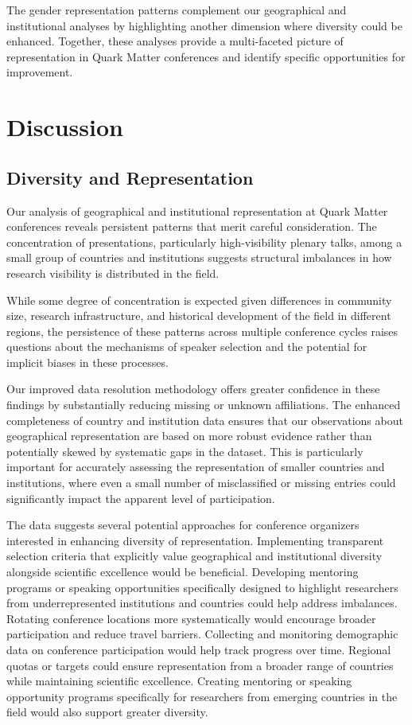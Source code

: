 \documentclass[a4paper,11pt]{article}
\begin{document}
The gender representation patterns complement our geographical and institutional analyses by highlighting another dimension where diversity could be enhanced. Together, these analyses provide a multi-faceted picture of representation in Quark Matter conferences and identify specific opportunities for improvement.

\section{Discussion}

\subsection{Diversity and Representation}

Our analysis of geographical and institutional representation at Quark Matter conferences reveals persistent patterns that merit careful consideration. The concentration of presentations, particularly high-visibility plenary talks, among a small group of countries and institutions suggests structural imbalances in how research visibility is distributed in the field.

While some degree of concentration is expected given differences in community size, research infrastructure, and historical development of the field in different regions, the persistence of these patterns across multiple conference cycles raises questions about the mechanisms of speaker selection and the potential for implicit biases in these processes.

Our improved data resolution methodology offers greater confidence in these findings by substantially reducing missing or unknown affiliations. The enhanced completeness of country and institution data ensures that our observations about geographical representation are based on more robust evidence rather than potentially skewed by systematic gaps in the dataset. This is particularly important for accurately assessing the representation of smaller countries and institutions, where even a small number of misclassified or missing entries could significantly impact the apparent level of participation.

The data suggests several potential approaches for conference organizers interested in enhancing diversity of representation. Implementing transparent selection criteria that explicitly value geographical and institutional diversity alongside scientific excellence would be beneficial. Developing mentoring programs or speaking opportunities specifically designed to highlight researchers from underrepresented institutions and countries could help address imbalances. Rotating conference locations more systematically would encourage broader participation and reduce travel barriers. Collecting and monitoring demographic data on conference participation would help track progress over time. Regional quotas or targets could ensure representation from a broader range of countries while maintaining scientific excellence. Creating mentoring or speaking opportunity programs specifically for researchers from emerging countries in the field would also support greater diversity.
\end{document}
